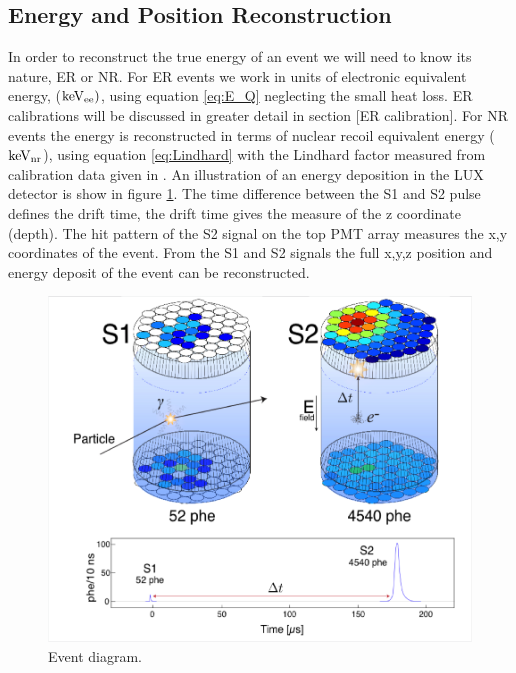 \subsection{Energy and Position Reconstruction}
In order to reconstruct the true energy of an event we will need to know its nature, ER or NR. For ER events we work in units of electronic equivalent energy, ($\rm keV_{ee})$, using equation \ref{eq:E_Q} neglecting the small heat loss. ER calibrations will be discussed in greater detail in section [ER calibration]. For NR events the energy is reconstructed in terms of nuclear recoil equivalent energy ($\rm keV_{nr}$), using equation \ref{eq:Lindhard} with the Lindhard factor measured from calibration data given in \cite{NEST} \cite{NEST_2013}.  An illustration of an energy deposition in the LUX detector is show in figure \ref{fig:LUX_Event}. The time difference between the S1 and S2 pulse defines the drift time, the drift time gives the measure of the z coordinate (depth). The hit pattern of the S2 signal on the top PMT array measures the x,y coordinates of the event. From the S1 and S2 signals the full x,y,z position and energy deposit of the event can be reconstructed.

 \begin{figure}[h!]\centering
\includegraphics[width=150mm]{Chapter_LUX_Det/LUX_Event_Diagram.png}
\caption{Event diagram.}
\label{fig:LUX_Event}
\end{figure}

